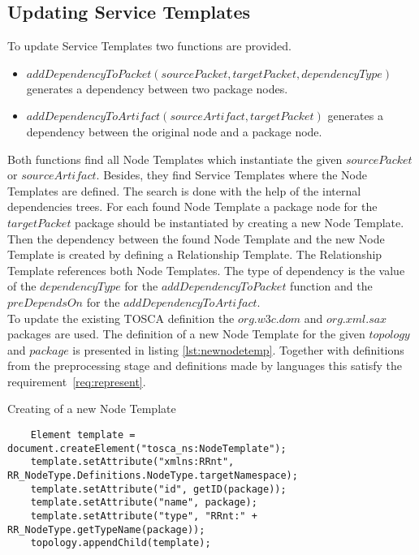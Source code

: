 \subsection*{Updating Service Templates}
To update Service Templates two functions are provided.
\begin{itemize}
	\item $addDependencyToPacket(sourcePacket, targetPacket, dependencyType)$ generates a dependency between two package nodes.
	\item $addDependencyToArtifact(sourceArtifact, targetPacket)$ generates a dependency between the original node and a package node.
\end{itemize} 
Both functions find all Node Templates which instantiate the given $sourcePacket$ or $sourceArtifact$.
Besides, they find Service Templates where the Node Templates are defined.
The search is done with the help of the internal dependencies trees.
For each found Node Template a package node for the $targetPacket$ package should be instantiated by creating a new Node Template.
Then the dependency between the found Node Template and the new Node Template is created by defining a Relationship Template.
The Relationship Template references both Node Templates. 
The type of dependency is the value of the $dependencyType$ for the $addDependencyToPacket$ function and the $preDependsOn$ for the $addDependencyToArtifact$.\\
To update the existing TOSCA definition the $org$.$w3c$.$dom$ and $org$.$xml$.$sax$ packages are used. 
The definition of a new Node Template for the given $topology$ and $package$ is presented in listing \ref{lst:newnodetemp}.
Together with definitions from the preprocessing stage and definitions made by languages this satisfy the requirement~\ref{req:represent}. 
\begin{Listing}
	\caption{Creating of a new Node Template}
	\label{lst:newnodetemp}
	\begin{lstlisting}  
	Element template = document.createElement("tosca_ns:NodeTemplate");
	template.setAttribute("xmlns:RRnt", RR_NodeType.Definitions.NodeType.targetNamespace);
	template.setAttribute("id", getID(package));
	template.setAttribute("name", package);
	template.setAttribute("type", "RRnt:" + RR_NodeType.getTypeName(package));
	topology.appendChild(template);
	\end{lstlisting}
\end{Listing}
